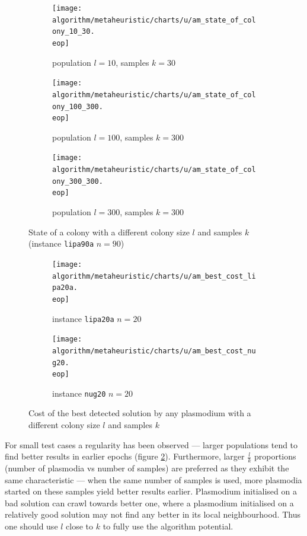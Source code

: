\documentclass[english,a4paper,twoside]{ppfcmthesis}
\begin{document}
\begin{figure}
  \centering

  \begin{subfigure}{\textwidth}
    \texttt{[image: algorithm/metaheuristic/charts/u/am\_state\_of\_colony\_10\_30.\\eop]}
    \caption{population $l=10$, samples $k=30$}
  \end{subfigure}
  \par\bigskip
  \begin{subfigure}{\textwidth}
    \texttt{[image: algorithm/metaheuristic/charts/u/am\_state\_of\_colony\_100\_300.\\eop]}
    \caption{population $l=100$, samples $k=300$}
  \end{subfigure}
  \par\bigskip
  \begin{subfigure}{\textwidth}
    \texttt{[image: algorithm/metaheuristic/charts/u/am\_state\_of\_colony\_300\_300.\\eop]}
    \caption{population $l=300$, samples $k=300$}
  \end{subfigure}

  \caption{State of a colony with a different colony size $l$ and samples $k$ (instance \texttt{lipa90a} $n=90$)}
  \label{figure:am_state_of_colony}
\end{figure}


\begin{figure}
  \centering

  \begin{subfigure}{\textwidth}
    \texttt{[image: algorithm/metaheuristic/charts/u/am\_best\_cost\_lipa20a.\\eop]}
    \caption{instance \texttt{lipa20a} $n=20$}
  \end{subfigure}
  \par\bigskip
  \begin{subfigure}{\textwidth}
    \texttt{[image: algorithm/metaheuristic/charts/u/am\_best\_cost\_nug20.\\eop]}
    \caption{instance \texttt{nug20} $n=20$}
  \end{subfigure}

  \caption{Cost of the best detected solution by any plasmodium with a different colony size $l$ and samples $k$}
  \label{figure:am_best_cost}
\end{figure}

For small test cases a regularity has been observed --- larger populations tend to find better results in earlier epochs (figure \ref{figure:am_best_cost}). Furthermore, larger $\frac{l}{k}$ proportions (number of plasmodia vs number of samples) are preferred as they exhibit the same characteristic --- when the same number of samples is used, more plasmodia started on these samples yield better results earlier. Plasmodium initialised on a bad solution can crawl towards better one, where a plasmodium initialised on a relatively good solution may not find any better in its local neighbourhood. Thus one should use $l$ close to $k$ to fully use the algorithm potential.
\end{document}
